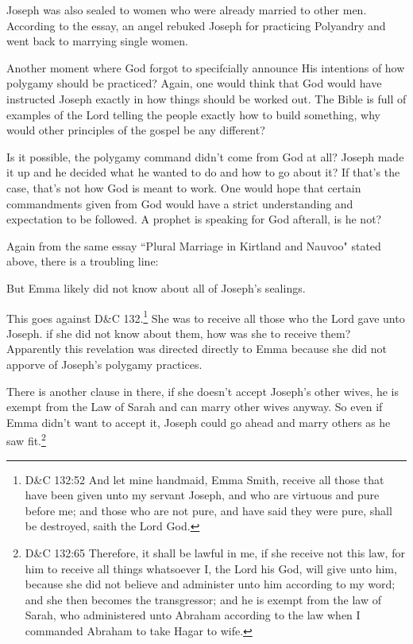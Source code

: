 Joseph was also sealed to women who were already married to other men. According to
the essay, an angel rebuked Joseph for practicing Polyandry and went back to marrying
single women.

Another moment where God forgot to specifcially announce His intentions of how
polygamy should be practiced? Again, one would think that God would have instructed
Joseph exactly in how things should be worked out. The Bible is full of examples
of the Lord telling the people exactly how to build something, why would other
principles of the gospel be any different?

Is it possible, the polygamy command didn't come from God at all? Joseph made it up
and he decided what he wanted to do and how to go about it? If that's the case,
that's not how God is meant to work. One would hope that certain commandments given
from God would have a strict understanding and expectation to be followed. A prophet
is speaking for God afterall, is he not?

Again from the same essay ``Plural Marriage in Kirtland and Nauvoo" stated above,
there is a troubling line:

\begin{displayquote}
But Emma likely did not know about all of Joseph’s sealings.
\end{displayquote}

This goes against D\&C 132.\footnote{
D\&C 132:52 And let mine handmaid, Emma Smith, receive all those that have been 
given unto my servant Joseph, and who are virtuous and pure before me; and those 
who are not pure, and have said they were pure, shall be destroyed, saith the 
Lord God.
} She was to receive all those who the Lord gave unto Joseph. if she did not know
about them, how was she to receive them? Apparently this revelation was directed
directly to Emma because she did not apporve of Joseph's polygamy practices.

There is another clause in there, if she doesn't accept Joseph's other wives, he is
exempt from the Law of Sarah and can marry other wives anyway. So even if Emma didn't
want to accept it, Joseph could go ahead and marry others as he saw fit.\footnote{
D\&C 132:65 Therefore, it shall be lawful in me, if she receive not this law, for him
to receive all things whatsoever I, the Lord his God, will give unto him, because she
did not believe and administer unto him according to my word; and she then becomes
the transgressor; and he is exempt from the law of Sarah, who administered unto
Abraham according to the law when I commanded Abraham to take Hagar to wife.
}

